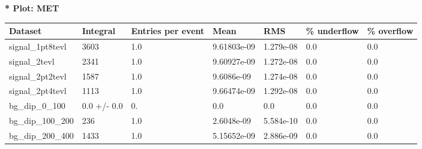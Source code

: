 \documentclass[a4paper, 10pt]{article}
\begin{document}
\textbf{* Plot: MET}\\
   \begin{table}[H]
  \begin{center}
    \begin{tabular}{|m{23.0mm}|m{23.0mm}|m{18.0mm}|m{19.0mm}|m{19.0mm}|m{19.0mm}|m{19.0mm}|}
      \hline
      {\cellcolor{yellow}         Dataset}& {\cellcolor{yellow}         Integral}& {\cellcolor{yellow}         Entries per event}& {\cellcolor{yellow}         Mean}& {\cellcolor{yellow}         RMS}& {\cellcolor{yellow}         \% underflow}& {\cellcolor{yellow}         \% overflow}\\
      \hline
      {\cellcolor{white}         signal\_1pt8tevl}& {\cellcolor{white}         3603}& {\cellcolor{white}         1.0}& {\cellcolor{white}         9.61803e-09}& {\cellcolor{white}         1.279e-08}& {\cellcolor{green}         0.0}& {\cellcolor{green}         0.0}\\
      \hline
      {\cellcolor{white}         signal\_2tevl}& {\cellcolor{white}         2341}& {\cellcolor{white}         1.0}& {\cellcolor{white}         9.60927e-09}& {\cellcolor{white}         1.272e-08}& {\cellcolor{green}         0.0}& {\cellcolor{green}         0.0}\\
      \hline
      {\cellcolor{white}         signal\_2pt2tevl}& {\cellcolor{white}         1587}& {\cellcolor{white}         1.0}& {\cellcolor{white}         9.6086e-09}& {\cellcolor{white}         1.274e-08}& {\cellcolor{green}         0.0}& {\cellcolor{green}         0.0}\\
      \hline
      {\cellcolor{white}         signal\_2pt4tevl}& {\cellcolor{white}         1113}& {\cellcolor{white}         1.0}& {\cellcolor{white}         9.66474e-09}& {\cellcolor{white}         1.292e-08}& {\cellcolor{green}         0.0}& {\cellcolor{green}         0.0}\\
      \hline
      {\cellcolor{white}         bg\_dip\_0\_100}& {\cellcolor{white}         0.0 +/\-- 0.0}& {\cellcolor{white}         0.}& {\cellcolor{white}         0.0}& {\cellcolor{white}         0.0}& {\cellcolor{green}         0.0}& {\cellcolor{green}         0.0}\\
      \hline
      {\cellcolor{white}         bg\_dip\_100\_200}& {\cellcolor{white}         236}& {\cellcolor{white}         1.0}& {\cellcolor{white}         2.6048e-09}& {\cellcolor{white}         5.584e-10}& {\cellcolor{green}         0.0}& {\cellcolor{green}         0.0}\\
      \hline
      {\cellcolor{white}         bg\_dip\_200\_400}& {\cellcolor{white}         1433}& {\cellcolor{white}         1.0}& {\cellcolor{white}         5.15652e-09}& {\cellcolor{white}         2.886e-09}& {\cellcolor{green}         0.0}& {\cellcolor{green}         0.0}\\

\end{tabular}
\end{center}
\end{table}
\end{document}
